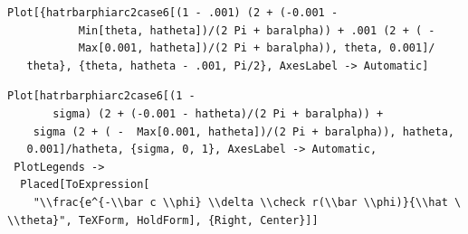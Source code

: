 \documentclass[reqno]{amsart}
\theoremstyle{definition} \newtheorem{definition}{Definition}[section]
\theoremstyle{definition} \newtheorem{remark}[definition]{Remark}
\theoremstyle{plain} \newtheorem{lemma}[definition]{Lemma}
\theoremstyle{plain} \newtheorem{proposition}[definition]{Proposition}
\theoremstyle{plain} \newtheorem{theorem}[definition]{Theorem}
\theoremstyle{plain} \newtheorem{corollary}[definition]{Corollary}
\theoremstyle{definition} \newtheorem{example}[definition]{Example}
\theoremstyle{plain} \newtheorem{claim}[clai]{Claim}
\theoremstyle{definition} \newtheorem{assumption}[definition]{Assumption}
\theoremstyle{definition} \newtheorem{observation}[definition]{Observation}
\newcommand{\1}{\mathbbm 1}
\newcommand{\sbig}{\bigskip}
\numberwithin{equation}{section} %
\theoremstyle{plain} \newtheorem*{theorem*}{Theorem}
\theoremstyle{plain} \newtheorem{mthm}[maintheorem]{Main Theorem}
\theoremstyle{plain} \newtheorem*{mthm*}{Main Theorem}
\theoremstyle{plain} \newtheorem*{conjecture*}{Conjecture}
\theoremstyle{plain} \newtheorem{conjecture}[definition]{Conjecture}
\theoremstyle{plain} \newtheorem*{problem*}{Problem}
\begin{document}
\begin{verbatim}
Plot[{hatrbarphiarc2case6[(1 - .001) (2 + (-0.001 - 
           Min[theta, hatheta])/(2 Pi + baralpha)) + .001 (2 + ( - 
           Max[0.001, hatheta])/(2 Pi + baralpha)), theta, 0.001]/
   theta}, {theta, hatheta - .001, Pi/2}, AxesLabel -> Automatic]
\end{verbatim}
\begin{verbatim}
Plot[hatrbarphiarc2case6[(1 - 
       sigma) (2 + (-0.001 - hatheta)/(2 Pi + baralpha)) + 
    sigma (2 + ( -  Max[0.001, hatheta])/(2 Pi + baralpha)), hatheta, 
   0.001]/hatheta, {sigma, 0, 1}, AxesLabel -> Automatic, 
 PlotLegends -> 
  Placed[ToExpression[
    "\\frac{e^{-\\bar c \\phi} \\delta \\check r(\\bar \\phi)}{\\hat \
\\theta}", TeXForm, HoldForm], {Right, Center}]]
\end{verbatim}

\sbig
\end{document}
